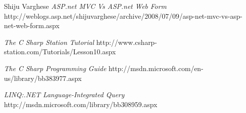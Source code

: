 \begin{thebibliography}{9}
		Shiju Varghese
		\emph{ASP.net MVC Vs ASP.net Web Form}
		http://weblogs.asp.net/shijuvarghese/archive/2008/07/09/asp-net-mvc-vs-asp-net-web-form.aspx

		\emph{The C Sharp Station Tutorial}
		http://www.csharp-station.com/Tutorials/Lesson10.aspx

		\emph{The C Sharp Programming Guide}
		http://msdn.microsoft.com/en-us/library/bb383977.aspx

		\emph{LINQ:.NET Language-Integrated Query}
		http://msdn.microsoft.com/library/bb308959.aspx
\end{thebibliography}
